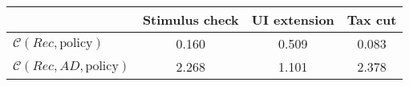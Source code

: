 \begin{tabular}{@{}lccc@{}} 
\toprule 
                          & Stimulus check      & UI extension    & Tax cut    \\  \midrule 
$\mathcal{C}(Rec,\text{policy})$ & 0.160  & 0.509  & 0.083     \\ 
$\mathcal{C}(Rec, AD,\text{policy})$ & 2.268  & 1.101  & 2.378     \\ 
\end{tabular}  
